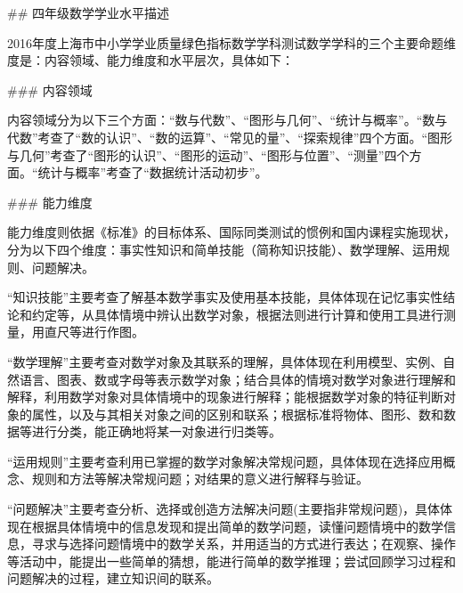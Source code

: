 ## 四年级数学学业水平描述


2016年度上海市中小学学业质量绿色指标数学学科测试数学学科的三个主要命题维度是：内容领域、能力维度和水平层次，具体如下：


### 内容领域


内容领域分为以下三个方面：“数与代数”、“图形与几何”、“统计与概率”。“数与代数”考查了“数的认识”、“数的运算”、“常见的量”、“探索规律”四个方面。“图形与几何”考查了“图形的认识”、“图形的运动”、“图形与位置”、“测量”四个方面。“统计与概率”考查了“数据统计活动初步”。


### 能力维度


能力维度则依据《标准》的目标体系、国际同类测试的惯例和国内课程实施现状，分为以下四个维度：事实性知识和简单技能（简称知识技能）、数学理解、运用规则、问题解决。


“知识技能”主要考查了解基本数学事实及使用基本技能，具体体现在记忆事实性结论和约定等，从具体情境中辨认出数学对象，根据法则进行计算和使用工具进行测量，用直尺等进行作图。


“数学理解”主要考查对数学对象及其联系的理解，具体体现在利用模型、实例、自然语言、图表、数或字母等表示数学对象；结合具体的情境对数学对象进行理解和解释，利用数学对象对具体情境中的现象进行解释；能根据数学对象的特征判断对象的属性，以及与其相关对象之间的区别和联系；根据标准将物体、图形、数和数据等进行分类，能正确地将某一对象进行归类等。


“运用规则”主要考查利用已掌握的数学对象解决常规问题，具体体现在选择应用概念、规则和方法等解决常规问题；对结果的意义进行解释与验证。


“问题解决”主要考查分析、选择或创造方法解决问题(主要指非常规问题)，具体体现在根据具体情境中的信息发现和提出简单的数学问题，读懂问题情境中的数学信息，寻求与选择问题情境中的数学关系，并用适当的方式进行表达；在观察、操作等活动中，能提出一些简单的猜想，能进行简单的数学推理；尝试回顾学习过程和问题解决的过程，建立知识间的联系。
